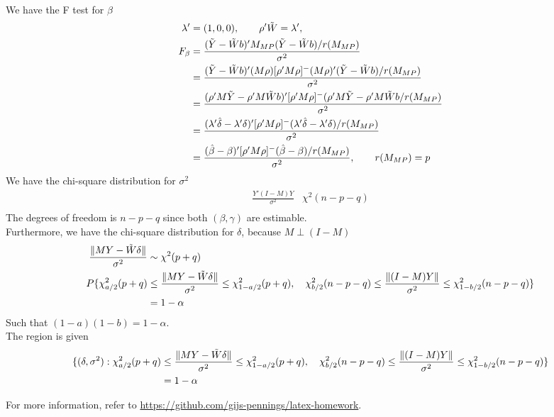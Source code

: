 \begin{itemize}
\begin{align*}
\end{align*}
We have the F test for $\beta$  
\begin{align*}
\lambda' &= (1,0,0), \qquad \rho'\Tilde{W} = \lambda', \\
F_{\beta} &= \frac{(\Tilde{Y}- \Tilde{W} b)'M_{MP} (\Tilde{Y}- \Tilde{W} b)/r(M_{MP})}{\sigma^2}\\
 &= \frac{(\Tilde{Y}- \Tilde{W} b)' (M\rho) [\rho' M \rho]^{-} (M\rho)' (\Tilde{Y}- \Tilde{W} b)/r(M_{MP})}{\sigma^2} \\
 &= \frac{( \rho'M \Tilde{Y}- \rho'M \Tilde{W} b)'  [\rho' M \rho]^{-} ( \rho'M \Tilde{Y}-  \rho'M \Tilde{W} b/r(M_{MP})}{\sigma^2} \\
&=  \frac{(\lambda' \hat{\delta} - \lambda' \delta)'  [\rho' M \rho]^{-} (\lambda' \hat{\delta} - \lambda' \delta)/r(M_{MP})}{\sigma^2} \\
&=  \frac{(\hat{\beta} - \beta)'  [\rho' M \rho]^{-} (\hat{\beta} - \beta)/r(M_{MP})}{\sigma^2}, \qquad r(M_{MP}) = p
\end{align*}
We have the chi-square distribution for $\sigma^2$ 
\begin{align*}
\frac{Y'(I-M) Y}{\sigma^2} & \chi^2(n-p-q) \\
\end{align*}
The degrees of freedom is $n-p-q$ since both $(\beta, \gamma)$ are estimable. \\
Furthermore, we have the chi-square distribution for $\delta$, because $M \perp (I-M)$
\begin{align*}
\frac{ \lVert M Y - \Tilde{W} \delta \rVert}{\sigma^2} & \sim \chi^2(p+q) \\
P\{ \chi^2_{a/2}{(p+q)} &\leq \frac{\lVert MY - \Tilde{W} \delta  \rVert}{\sigma^2} \leq \chi^2_{1-a/2}{(p+q)}, \quad
\chi^2_{b/2}{(n-p-q)} \leq \frac{\lVert (I-M) Y \rVert}{\sigma^2} \leq \chi^2_{1-b/2}{(n-p-q)} \}\\
&= 1- \alpha
\end{align*}
Such that $(1-a)(1-b) = 1-\alpha$. \\
The region is given
\begin{align*}
\{(\delta, \sigma^2): \chi^2_{a/2}{(p+q)} &\leq \frac{\lVert MY -\Tilde{W} \delta \rVert}{\sigma^2} \leq \chi^2_{1-a/2}{(p+q)}, \quad
\chi^2_{b/2}{(n-p-q)} \leq \frac{\lVert (I-M) Y \rVert}{\sigma^2} \leq \chi^2_{1-b/2}{(n-p-q)} \}\\
&= 1- \alpha
\end{align*}
\end{itemize}



For more information, refer to \url{https://github.com/gijs-pennings/latex-homework}.



